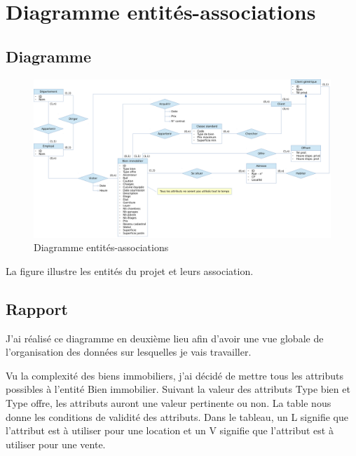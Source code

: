 \chapter{Diagramme entités-associations}

\section{Diagramme}

\begin{figure}
  \centering
  \includegraphics[angle=90,height=0.99\textheight]{IMG/er}
  \caption{Diagramme entités-associations}
  \label{img_er}
\end{figure}

La figure  illustre les entités du projet et leurs association.

\section{Rapport}

J'ai réalisé ce diagramme en deuxième lieu afin d'avoir une vue globale de l'organisation des données sur lesquelles je vais travailler.

Vu la complexité des biens immobiliers, j'ai décidé de mettre tous les attributs possibles à l'entité \og{}Bien immobilier\fg{}. Suivant la valeur des attributs \og{}Type bien\fg{} et \og{}Type offre\fg{}, les attributs auront une valeur pertinente ou non. La table  nous donne les conditions de validité des attributs. Dans le tableau, un \og{}L\fg{} signifie que l'attribut est à utiliser pour une location et un \og{}V\fg{} signifie que l'attribut est à utiliser pour une vente.

